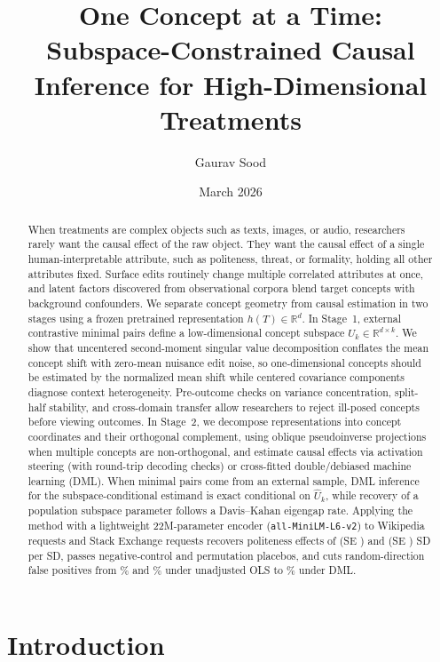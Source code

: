 \documentclass[11pt]{article}
\title{One Concept at a Time:\\
Subspace-Constrained Causal Inference for High-Dimensional Treatments}
\author{Gaurav Sood}
\date{March 2026}
\begin{document}
\maketitle

\begin{abstract}
\noindent When treatments are complex objects such as texts, images, or audio, researchers rarely want the causal effect of the raw object. They want the causal effect of a single human-interpretable attribute, such as politeness, threat, or formality, holding all other attributes fixed. Surface edits routinely change multiple correlated attributes at once, and latent factors discovered from observational corpora blend target concepts with background confounders. We separate concept geometry from causal estimation in two stages using a frozen pretrained representation $h(T) \in \mathbb{R}^d$. In Stage~1, external contrastive minimal pairs define a low-dimensional concept subspace $U_k \in \mathbb{R}^{d \times k}$. We show that uncentered second-moment singular value decomposition conflates the mean concept shift with zero-mean nuisance edit noise, so one-dimensional concepts should be estimated by the normalized mean shift while centered covariance components diagnose context heterogeneity. Pre-outcome checks on variance concentration, split-half stability, and cross-domain transfer allow researchers to reject ill-posed concepts before viewing outcomes. In Stage~2, we decompose representations into concept coordinates and their orthogonal complement, using oblique pseudoinverse projections when multiple concepts are non-orthogonal, and estimate causal effects via activation steering (with round-trip decoding checks) or cross-fitted double/debiased machine learning (DML). When minimal pairs come from an external sample, DML inference for the subspace-conditional estimand is exact conditional on $\hat{U}_k$, while recovery of a population subspace parameter follows a Davis--Kahan eigengap rate. Applying the method with a lightweight 22M-parameter encoder (\texttt{all-MiniLM-L6-v2}) to \empNWiki{} Wikipedia requests and \empNSe{} Stack Exchange requests recovers politeness effects of \empWikiDml{} (SE \empWikiDmlSe) and \empSeDml{} (SE \empSeDmlSe) SD per SD, passes negative-control and permutation placebos, and cuts random-direction false positives from \empWikiRandOls\% and \empSeRandOls\% under unadjusted OLS to \empWikiRandDml\% under DML.
\end{abstract}

\section{Introduction}
\end{document}
